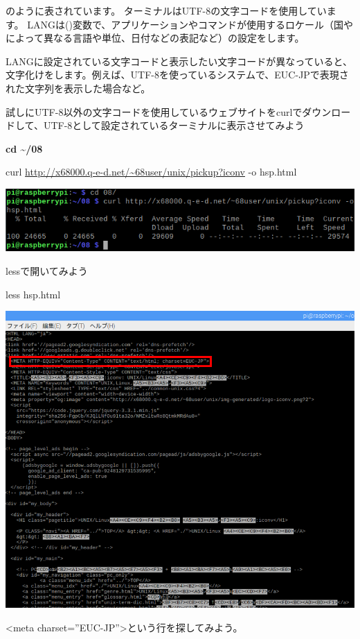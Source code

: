 のように表されています。
ターミナルはUTF-8の文字コードを使用しています。
LANGは()変数で、アプリケーションやコマンドが使用するロケール（国やによって異なる言語や単位、日付などの表記など）の設定をします。


LANGに設定されている文字コードと表示したい文字コードが異なっていると、文字化けをします。例えば、UTF-8を使っているシステムで、EUC-JPで表現された文字列を表示した場合など。


試しにUTF-8以外の文字コードを使用しているウェブサイトをcurlでダウンロードして、UTF-8として設定されているターミナルに表示させてみよう

\textbf{cd {\textasciitilde}/08}

curl \url{http://x68000.q-e-d.net/~68user/unix/pickup?iconv} -o hsp.html

\begin{center}
\includegraphics[width=\textwidth]{./text08-img/textbook-img020.png}

\end{center}

\bigskip

\clearpage
lessで開いてみよう

less hsp.html



\begin{center}
\includegraphics[width=\textwidth]{./text08-img/textbook-img021-1.png}

\end{center}
{\textless}meta
charset=”EUC-JP”{\textgreater}という行を探してみよう。


